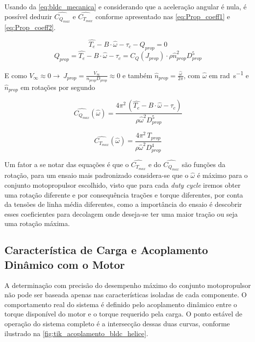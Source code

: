 Usando da \autoref{eq:bldc_mecanica} e considerando que a aceleração angular é nula, é possível deduzir $\hat{C_{Q_{max}}}$ e  $\hat{C_{T_{max}}}$ conforme apresentado nas \autoref{eq:Prop_coeff1} e \autoref{eq:Prop_coeff2}.

\[
\hat{T_e} - B \cdot \hat{\omega} - \tau_c - Q_{prop} = 0
\]
\[
Q_{prop} = \hat{T_e} - B \cdot \hat{\omega} - \tau_c = C_Q (J_{prop}) \cdot \rho \hat{n}^2_{prop} {D}^5_{prop}
\]

E como $V_{\infty} \approx 0 \rightarrow \ J_{prop} = \frac{V_{\infty}}{n_{prop}D_{prop}} \approx 0$ e também $\hat{n}_{prop} = \frac{\hat{\omega}}{2\pi}$, com $\hat{\omega}$ em \si{\radian\per\second} e $\hat{n}_{prop}$ em rotações por segundo

\begin{equation}
    \hat{C_{Q_{max}}} (\hat{\omega})= \frac{4\pi^2 \, (\hat{T_e}- B\cdot \hat{\omega} - \tau_c) }{\rho \hat{\omega}^2D_{prop}^5}
    \label{eq:Prop_coeff1}
\end{equation}

\begin{equation}
    \hat{C_{T_{max}}} (\hat{\omega}) = \frac{4\pi^2 \, T_{prop}}{\rho \hat{\omega}^2D_{prop}^4}
    \label{eq:Prop_coeff2}
\end{equation}

Um fator a se notar das equações é que o $\hat{C_{T_{max}}}$ e do $\hat{C_{Q_{max}}}$ são funções da rotação, para um ensaio mais padronizado considera-se que o $\hat{\omega}$ é máximo para o conjunto motopropulsor escolhido, visto que para cada \textit{duty cycle} iremos obter uma rotação diferente e por consequência trações e torque diferentes, por conta da tensões de linha média diferentes, como a importância do ensaio é descobrir esses coeficientes para decolagem onde deseja-se ter uma maior tração ou seja uma rotação máxima.

\subsection{Característica de Carga e Acoplamento Dinâmico com o Motor}
\label{sec:helice_acoplamento}


A determinação com precisão do desempenho máximo do conjunto motopropulsor não pode ser baseada apenas nas características isoladas de cada componente. O comportamento real do sistema é definido pelo acoplamento dinâmico entre o torque disponível do motor e o torque requerido pela carga. O ponto estável de operação do sistema completo é a intersecção dessas duas curvas, conforme ilustrado na \autoref{fig:tik_acoplamento_bldc_helice}.

